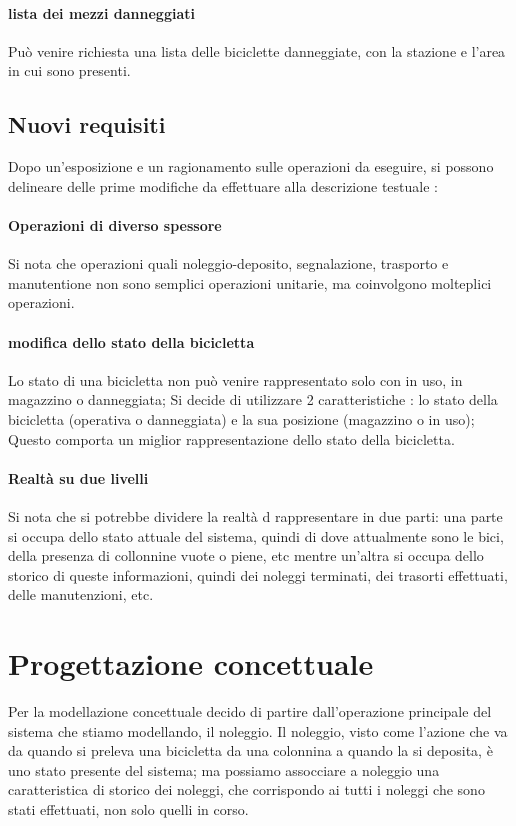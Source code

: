 \documentclass[a4paper,twoside]{article}
\begin{document}
\paragraph{lista dei mezzi danneggiati} Può venire richiesta una lista delle biciclette danneggiate, con la stazione e l'area in cui sono presenti.

\subsection{Nuovi requisiti}
Dopo un'esposizione e un ragionamento sulle operazioni da eseguire, si possono delineare delle prime modifiche da effettuare alla descrizione testuale :
\paragraph{Operazioni di diverso spessore} Si nota che operazioni quali noleggio-deposito, segnalazione, trasporto e manutentione non sono semplici operazioni unitarie, ma coinvolgono molteplici operazioni.
\paragraph{modifica dello stato della bicicletta} Lo stato di una bicicletta non può venire rappresentato solo con in uso, in magazzino o danneggiata; Si decide di utilizzare 2 caratteristiche : lo stato della bicicletta (operativa o danneggiata) e la sua posizione (magazzino o in uso); Questo comporta un miglior rappresentazione dello stato della bicicletta.
\paragraph{Realtà su due livelli} Si nota che si potrebbe dividere la realtà d rappresentare in due parti: una parte si occupa dello stato attuale del sistema, quindi di dove attualmente sono le bici, della presenza di collonnine vuote o piene, etc mentre un'altra si occupa dello storico di queste informazioni, quindi dei noleggi terminati, dei trasorti effettuati, delle manutenzioni, etc.

\section{Progettazione concettuale}
Per la modellazione concettuale decido di partire dall'operazione principale del sistema che stiamo modellando, il noleggio.
Il noleggio, visto come l'azione che va da quando si preleva una bicicletta da una colonnina a quando la si deposita, è uno stato presente del sistema; ma possiamo assocciare a noleggio una caratteristica di storico dei noleggi, che corrispondo ai tutti i noleggi che sono stati effettuati, non solo quelli in corso.
\end{document}
